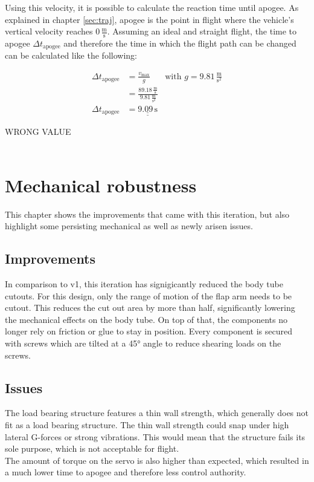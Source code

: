 \documentclass[fontsize=11pt,%
twoside,%
BCOR          = 8mm, %
DIV           = 11,  %
titlepage     = off,%
index=totoc,%
xcolor        = pdftex,%
dvipsnames,%
bibliography  = totoc,%
bibliography = numbered, %
listof        = notnumbered]{scrreprt}
\begin{document}
Using this velocity, it is possible to calculate the reaction time until apogee. As explained in chapter \ref{sec:traj}, apogee is the point in flight where the vehicle's vertical velocity reaches $0\,\frac{\text{m}}{\text{s}}$. Assuming an ideal and straight flight, the time to apogee $\Delta t_\text{apogee}$ and therefore the time in which the flight path can be changed can be calculated like the following:

\begin{align*}
	\Delta t_\text{apogee} &= \frac{v_\text{max}}{g} & \text{with } g = 9.81\,\frac{\text{m}}{\text{s}^2}\\
	&= \frac{89.18\,\frac{\text{m}}{\text{s}}}{9.81\,\frac{\text{m}}{\text{s}^2}} \\
	\Delta t_\text{apogee} &= \underline{\underline{9.09\,\text{s}}}
\end{align*}

WRONG VALUE \\\\

\newpage

\section{Mechanical robustness}
This chapter shows the improvements that came with this iteration, but also highlight some persisting mechanical as well as newly arisen issues.

\subsection{Improvements}
In comparison to v1, this iteration has signigicantly reduced the body tube cutouts. For this design, only the range of motion of the flap arm needs to be cutout. This reduces the cut out area by more than half, significantly lowering the mechanical effects on the body tube. On top of that, the components no longer rely on friction or glue to stay in position. Every component is secured with screws which are tilted at a 45° angle to reduce shearing loads on the screws.\\

\subsection{Issues}
The load bearing structure features a thin wall strength, which generally does not fit as a load bearing structure. The thin wall strength could snap under high lateral G-forces or strong vibrations. This would mean that the structure fails its sole purpose, which is not acceptable for flight.\\
The amount of torque on the servo is also higher than expected, which resulted in a much lower time to apogee and therefore less control authority. 
\end{document}
